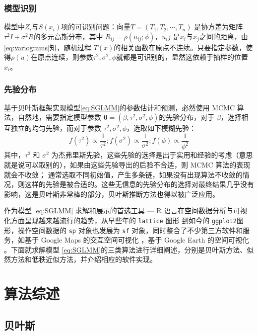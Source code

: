 \documentclass[hyperref, a4paper, UTF8, zihao = -4, linespread = 1.25, scheme = chinese]{ctexbook}
\begin{document}
\subsection{模型识别}

模型中\(Z_{i}\)与\(S(x_i)\)项的可识别问题：向量\(T=(T_1,T_2,\cdots,T_n)\)
是协方差为矩阵 \(\tau^2I+\sigma^2R\)的多元高斯分布，其中
\(R_{ij}=\rho(u_{ij};\phi)\)，\(u_ij\)
是\(x_i\)与\(x_j\)之间的距离，由\eqref{eq:variograms}知，随机过程
\(T(x)\)的相关函数在原点不连续。只要指定参数，使得\(\rho(u)\)在原点连续，则参数\(\tau^2,\sigma^2,\phi\)就都是可识别的，显然这依赖于抽样的位置\(x_i\)\citep{Diggle2002}。

\subsection{先验分布}

基于贝叶斯框架实现模型\eqref{eq:SGLMM}的参数估计和预测，必然使用 MCMC
算法，自然地，需要指定模型参数
\(\bm{\theta} = (\beta,\tau^2,\sigma^2,\phi)\)的先验分布，对于
\(\beta\)，选择相互独立的均匀先验，而对于参数
\(\tau^2,\sigma^2,\phi\)，选取如下模糊先验：
\[f(\tau^2) \propto \frac{1}{\tau^2};f(\sigma^2) \propto \frac{1}{\sigma^2};f(\phi) \propto \frac{1}{\phi^2}\]
其中，\(\tau^2\) 和 \(\sigma^2\)
为杰弗里斯先验，这些先验的选择是出于实用和经验的考虑（意思就是说可以取别的），如果由这些先验导出的后验不合适，则
MCMC 算法的表现就会不收敛；
通常选取不同初始值，产生多条链，如果没有出现算法不收敛的情况，则这样的先验是被合适的。这些无信息的先验分布的选择对最终结果几乎没有影响，这是贝叶斯非常棒的部分，贝叶斯推断方法也得以被广泛应用\citep{mao2006}。

作为模型 \eqref{eq:SGLMM} 求解和展示的首选工具 --- R
语言在空间数据分析与可视化方面呈现越来越流行的趋势，从早些年的
\texttt{lattice} 图形\citep{lattice2008} 到如今的
\texttt{ggplot2}图形\citep{ggplot22016}，操作空间数据的 \texttt{sp}
对象\citep{R-sp}也发展为 \texttt{sf}
对象\citep{R-sf}，同时整合了不少第三方软件和服务，如基于 Google Maps
的交互空间可视化 \citep{plotGoogleMaps2012}，基于 Google Earth
的空间可视化 \citep{plotKML2015}。下面就求解模型
\eqref{eq:SGLMM}的三类算法进行详细阐述，分别是贝叶斯方法、似然方法和低秩近似方法，并介绍相应的软件实现。

\hypertarget{algorithms}{%
\chapter{算法综述}\label{algorithms}}

\hypertarget{bayes}{%
\section{贝叶斯}\label{bayes}}
\end{document}
